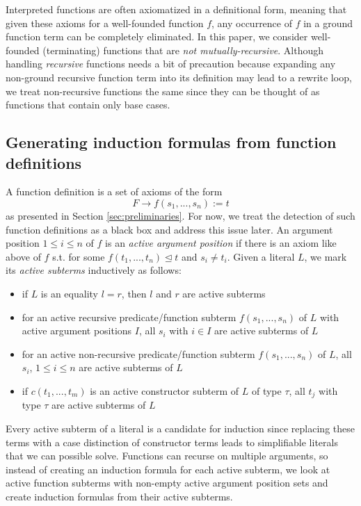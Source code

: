 
Interpreted functions are often axiomatized in a definitional form, meaning that given these axioms for a well-founded function $f$, any occurrence of $f$ in a ground function term can be completely eliminated. In this paper, we consider well-founded (terminating) functions that are \textit{not mutually-recursive}. Although handling \textit{recursive} functions needs a bit of precaution because expanding any non-ground recursive function term into its definition may lead to a rewrite loop, we treat non-recursive functions the same since they can be thought of as functions that contain only base cases.
\subsection{Generating induction formulas from function definitions}\label{sec:generating}
A function definition is a set of axioms of the form
$$F\rightarrow f(s_1,...,s_n):=t$$
as presented in Section \ref{sec:preliminaries}. For now, we treat the detection of such function definitions as a black box and address this issue later. An argument position $1\le i\le n$ of $f$ is an \textit{active argument position} if there is an axiom like above of $f$ s.t. for some $f(t_1,...,t_n)\trianglelefteq t$ and $s_i\neq t_i$. Given a literal $L$, we mark its \textit{active subterms} inductively as follows:
\begin{itemize}
	\item if $L$ is an equality $l=r$, then $l$ and $r$ are active subterms
	\item for an active recursive predicate/function subterm $f(s_1,...,s_n)$ of $L$ with active argument positions $I$, all $s_i$ with $i\in I$ are active subterms of $L$
	\item for an active non-recursive predicate/function subterm $f(s_1,...,s_n)$ of $L$, all $s_i$, $1\le i\le n$ are active subterms of $L$
	\item if $c(t_1,...,t_m)$ is an active constructor subterm of $L$ of type $\tau$, all $t_j$ with type $\tau$ are active subterms of $L$
\end{itemize}

Every active subterm of a literal is a candidate for induction since replacing these terms with a case distinction of constructor terms leads to simplifiable literals that we can possible solve. Functions can recurse on multiple arguments, so instead of creating an induction formula for each active subterm, we look at active function subterms with non-empty active argument position sets and create induction formulas from their active subterms.

